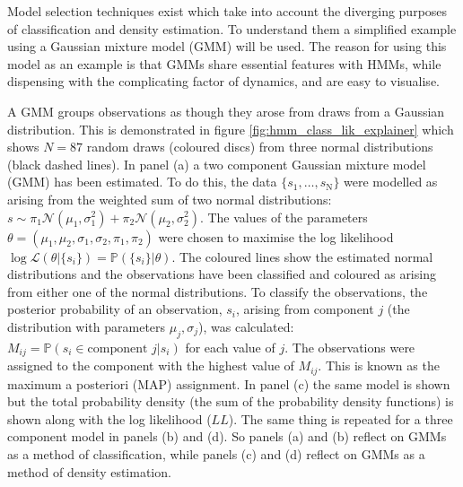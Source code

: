 Model selection techniques exist which take into account the diverging purposes of classification and density estimation. To understand them a  simplified example using a Gaussian mixture model (GMM) \cite{reynolds2009gaussian} will be used. The reason for using this model as an example is that GMMs share essential features with HMMs, while dispensing with the complicating factor of dynamics, and are easy to visualise.  

A GMM groups observations as though they arose from draws from a Gaussian distribution. This is demonstrated in figure \ref{fig:hmm_class_lik_explainer} which shows $N = \num{87}$ random draws (coloured discs) from three normal distributions (black dashed lines). In panel (a) a two component Gaussian mixture model (GMM) has been estimated. To do this, the data $\{s_{1}, \ldots, s_{\mathrm{N}}\}$ were modelled as arising from the weighted sum of two normal distributions: $s \sim \pi_{1}\mathcal{N}\left(\mu_{1}, \sigma_{1}^{2}\right) +  \pi_{2}\mathcal{N}\left(\mu_{2}, \sigma_{2}^{2}\right)$. The values of the parameters $\theta = (\mu_{1}, \mu_{2}, \sigma_{1}, \sigma_{2}, \pi_{1}, \pi_{2})$ were chosen to maximise the log likelihood $\log{\mathcal{L}(\theta | \{s_{i}\})} = \mathbb{P}(\{s_{i}\}|\theta)$.  The coloured lines show the estimated normal distributions and the observations have been classified and coloured as arising from either one of the normal distributions. To classify the observations, the posterior probability of an  observation, $s_{i}$, arising from component $j$ (the distribution with parameters $\mu_{j}, \sigma_{j}$), was calculated: $M_{ij}=\mathbb{P}(s_{i} \in \text{component }j |s_{i})$ for each value of $j$. The observations were assigned to the component with the highest value of $M_{ij}$. This is known as the maximum a posteriori (MAP) assignment. In panel (c) the same model is shown but the total probability density (the sum of the probability density functions) is shown along with the log likelihood ($LL$). The same thing is repeated for a three component model in panels (b) and (d). So panels (a) and (b) reflect on GMMs as a method of classification, while panels (c) and (d) reflect on GMMs as a method of density estimation. 

